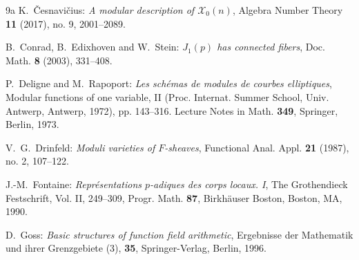 \documentclass[10pt]{amsart}
\theoremstyle{plain}
\theoremstyle{definition}
\newcommand{\sX}{\mathscr{X}}
\begin{document}
\begin{thebibliography}{9a}
K.~\v{C}esnavi\v{c}ius:
\emph{A modular description of $\sX_0(n)$}, 
Algebra Number Theory \textbf{11} (2017), no. 9, 2001--2089.




B.~Conrad, B.~Edixhoven and W.~Stein:
\emph{$J_1(p)$ has connected fibers},
Doc. Math. \textbf{8} (2003), 331--408.

P.~Deligne and M.~Rapoport: \emph{Les sch\'{e}mas de modules de courbes elliptiques}, Modular functions of one variable, II (Proc. Internat. Summer School, 
Univ. Antwerp, Antwerp, 1972), pp. 143--316. Lecture Notes in Math. \textbf{349}, Springer, Berlin, 1973.

V.~G.~Drinfeld:
\emph{Moduli varieties of $F$-sheaves},
Functional Anal. Appl. \textbf{21} (1987), no. 2, 107--122. 


J.-M.~Fontaine:
\emph{Repr\'{e}sentations $p$-adiques des corps locaux. I},
The Grothendieck Festschrift, Vol. II, 249--309, Progr. Math. \textbf{87}, Birkh\"{a}user Boston, Boston, MA, 1990. 




D.~Goss:
\emph{Basic structures of function field arithmetic},
Ergebnisse der Mathematik und ihrer Grenzgebiete (3), \textbf{35}, 
Springer-Verlag, Berlin, 1996. 




\end{thebibliography}
\end{document}
